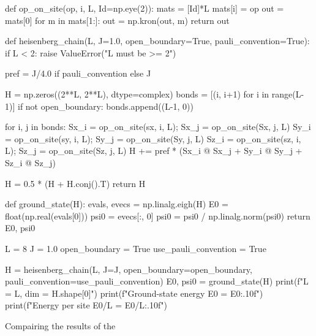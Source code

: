 \documentclass{article}
\begin{document}
\begin{python}
    def op_on_site(op, i, L, Id=np.eye(2)):
        mats = [Id]*L
        mats[i] = op
        out = mats[0]
        for m in mats[1:]:
            out = np.kron(out, m)
        return out
\end{python}

\begin{python}
    def heisenberg_chain(L, J=1.0, open_boundary=True, pauli_convention=True):
        if L < 2:
            raise ValueError("L must be >= 2")

        pref = J/4.0 if pauli_convention else J
    
        H = np.zeros((2**L, 2**L), dtype=complex)
        bonds = [(i, i+1) for i in range(L-1)]
        if not open_boundary:
            bonds.append((L-1, 0)) 
    
        for i, j in bonds:
            Sx_i = op_on_site(sx, i, L); Sx_j = op_on_site(Sx, j, L)
            Sy_i = op_on_site(sy, i, L); Sy_j = op_on_site(Sy, j, L)
            Sz_i = op_on_site(sz, i, L); Sz_j = op_on_site(Sz, j, L)
            H += pref * (Sx_i @ Sx_j + Sy_i @ Sy_j + Sz_i @ Sz_j)
    
        H = 0.5 * (H + H.conj().T)
        return H
\end{python}

\begin{python}
    def ground_state(H):
        evals, evecs = np.linalg.eigh(H)
        E0 = float(np.real(evals[0]))
        psi0 = evecs[:, 0]
        psi0 = psi0 / np.linalg.norm(psi0)
        return E0, psi0
\end{python}

\begin{python}
    L = 8                  
    J = 1.0
    open_boundary = True
    use_pauli_convention = True  
    
    H = heisenberg_chain(L, J=J, open_boundary=open_boundary,
                         pauli_convention=use_pauli_convention)
    E0, psi0 = ground_state(H)
    print(f"L = {L}, dim = {H.shape[0]}")
    print(f"Ground-state energy E0 = {E0:.10f}")
    print(f"Energy per site E0/L = {E0/L:.10f}")
\end{python}

\noindent Compairing the results of the 
\end{document}
